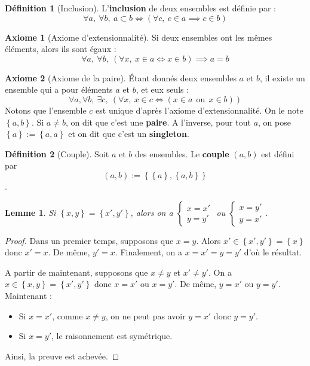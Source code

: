 \documentclass[french]{book}
\theoremstyle{plain}
\newtheorem{lem}{Lemme}[chapter]
\theoremstyle{definition}
\newtheorem{dfn}{Définition}[chapter]
\newtheorem{ax}{Axiome}[chapter]
\theoremstyle{remark}
\begin{document}
\begin{dfn}[Inclusion]
	L'\textbf{inclusion} de deux ensembles est définie par : $$\forall a,\ \forall b,\ a\subset b \iff \left(\forall c,\ c\in a\implies c\in b\right)$$
\end{dfn}
\begin{ax}[Axiome d'extensionnalité]
	Si deux ensembles ont les mêmes éléments, alors ils sont égaux : $$\forall a,\ \forall b,\ \left(\forall x,\ x\in a\iff x\in b\right)\implies a=b$$
\end{ax}
\begin{ax}[Axiome de la paire]
	Étant donnés deux ensembles $a$ et $b$, il existe un ensemble qui a pour éléments $a$ et $b$, et eux seuls : $$\forall a,\forall b,\ \exists c,\ \left(\forall x,\ x\in c\iff \left(x\in a\ \ \text{ou}\ \ x\in b\right)\right)$$
	Notons que l'ensemble $c$ est unique d'après l'axiome d'extensionnalité. On le note $\left\{a,b\right\}$. Si $a\ne b$, on dit que c'est une \textbf{paire}. A l'inverse, pour tout $a$, on pose $\left\{a\right\}:=\left\{a,a\right\}$ et on dit que c'est un \textbf{singleton}.
\end{ax}
\begin{dfn}[Couple]
	Soit $a$ et $b$ des ensembles. Le \textbf{couple} $(a,b)$ est défini par $$(a,b):=\left\{\left\{a\right\},\left\{a,b\right\}\right\}$$.
\end{dfn}
\begin{lem}
	Si $\left\{x,y\right\}=\left\{x',y'\right\}$, alors on a $\displaystyle\begin{cases}
		x=x' \\ y=y'
	\end{cases}$ ou $\displaystyle\begin{cases}
	x=y' \\ y=x'
	\end{cases}$.
\end{lem}
\begin{proof}
	Dans un premier temps, supposons que $x=y$. Alors $x'\in\left\{x',y'\right\}=\left\{x\right\}$ donc $x'=x$. De même, $y'=x$. Finalement, on a $x=x'=y=y'$ d'où le résultat. \par A partir de maintenant, supposons que $x\ne y$ et $x'\ne y'$. On a $x\in\left\{x,y\right\}=\left\{x',y'\right\}$ donc $x=x'$ ou $x=y'$. De même, $y=x'$ ou $y=y'$. Maintenant : 
	\begin{itemize}
		\item Si $x=x'$, comme $x\ne y$, on ne peut pas avoir $y=x'$ donc $y=y'$.
		\item Si $x=y'$, le raisonnement est symétrique.
	\end{itemize}
	Ainsi, la preuve est achevée.
\end{proof}
\end{document}
